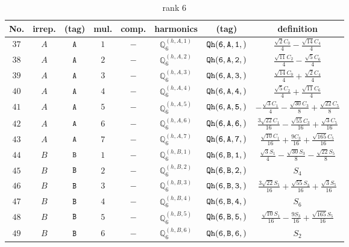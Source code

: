 \documentclass[fleqn,8pt]{jsarticle}
\begin{document}
\begin{table}[ht!]
\begin{center}
\caption{rank 6}
\renewcommand{\arraystretch}{1.3}
\begin{tabular}{cccccccc} \hline \hline
No. & irrep. & (tag) & mul. & comp. & harmonics & (tag) & definition \\ \hline
$ 37 $ & $ A $ & $ {\tt A} $ & $ 1 $ & $ - $ & $ \mathbb{Q}_{6}^{(h,A,1)} $ & $ {\tt Qh(6,A,1,)} $ & $ \frac{\sqrt{2} C_{0}}{4} - \frac{\sqrt{14} C_{4}}{4} $ \\
$ 38 $ & $ A $ & $ {\tt A} $ & $ 2 $ & $ - $ & $ \mathbb{Q}_{6}^{(h,A,2)} $ & $ {\tt Qh(6,A,2,)} $ & $ \frac{\sqrt{11} C_{2}}{4} - \frac{\sqrt{5} C_{6}}{4} $ \\
$ 39 $ & $ A $ & $ {\tt A} $ & $ 3 $ & $ - $ & $ \mathbb{Q}_{6}^{(h,A,3)} $ & $ {\tt Qh(6,A,3,)} $ & $ \frac{\sqrt{14} C_{0}}{4} + \frac{\sqrt{2} C_{4}}{4} $ \\
$ 40 $ & $ A $ & $ {\tt A} $ & $ 4 $ & $ - $ & $ \mathbb{Q}_{6}^{(h,A,4)} $ & $ {\tt Qh(6,A,4,)} $ & $ \frac{\sqrt{5} C_{2}}{4} + \frac{\sqrt{11} C_{6}}{4} $ \\
$ 41 $ & $ A $ & $ {\tt A} $ & $ 5 $ & $ - $ & $ \mathbb{Q}_{6}^{(h,A,5)} $ & $ {\tt Qh(6,A,5,)} $ & $ - \frac{\sqrt{3} C_{1}}{4} - \frac{\sqrt{30} C_{3}}{8} + \frac{\sqrt{22} C_{5}}{8} $ \\
$ 42 $ & $ A $ & $ {\tt A} $ & $ 6 $ & $ - $ & $ \mathbb{Q}_{6}^{(h,A,6)} $ & $ {\tt Qh(6,A,6,)} $ & $ \frac{3 \sqrt{22} C_{1}}{16} - \frac{\sqrt{55} C_{3}}{16} + \frac{\sqrt{3} C_{5}}{16} $ \\
$ 43 $ & $ A $ & $ {\tt A} $ & $ 7 $ & $ - $ & $ \mathbb{Q}_{6}^{(h,A,7)} $ & $ {\tt Qh(6,A,7,)} $ & $ \frac{\sqrt{10} C_{1}}{16} + \frac{9 C_{3}}{16} + \frac{\sqrt{165} C_{5}}{16} $ \\
$ 44 $ & $ B $ & $ {\tt B} $ & $ 1 $ & $ - $ & $ \mathbb{Q}_{6}^{(h,B,1)} $ & $ {\tt Qh(6,B,1,)} $ & $ \frac{\sqrt{3} S_{1}}{4} - \frac{\sqrt{30} S_{3}}{8} - \frac{\sqrt{22} S_{5}}{8} $ \\
$ 45 $ & $ B $ & $ {\tt B} $ & $ 2 $ & $ - $ & $ \mathbb{Q}_{6}^{(h,B,2)} $ & $ {\tt Qh(6,B,2,)} $ & $ S_{4} $ \\
$ 46 $ & $ B $ & $ {\tt B} $ & $ 3 $ & $ - $ & $ \mathbb{Q}_{6}^{(h,B,3)} $ & $ {\tt Qh(6,B,3,)} $ & $ \frac{3 \sqrt{22} S_{1}}{16} + \frac{\sqrt{55} S_{3}}{16} + \frac{\sqrt{3} S_{5}}{16} $ \\
$ 47 $ & $ B $ & $ {\tt B} $ & $ 4 $ & $ - $ & $ \mathbb{Q}_{6}^{(h,B,4)} $ & $ {\tt Qh(6,B,4,)} $ & $ S_{6} $ \\
$ 48 $ & $ B $ & $ {\tt B} $ & $ 5 $ & $ - $ & $ \mathbb{Q}_{6}^{(h,B,5)} $ & $ {\tt Qh(6,B,5,)} $ & $ \frac{\sqrt{10} S_{1}}{16} - \frac{9 S_{3}}{16} + \frac{\sqrt{165} S_{5}}{16} $ \\
$ 49 $ & $ B $ & $ {\tt B} $ & $ 6 $ & $ - $ & $ \mathbb{Q}_{6}^{(h,B,6)} $ & $ {\tt Qh(6,B,6,)} $ & $ S_{2} $ \\
 \hline \hline
\end{tabular}
\end{center}
\end{table}
\end{document}
